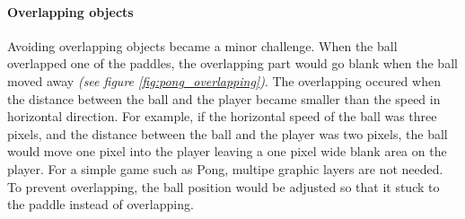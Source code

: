 \paragraph{Overlapping objects} 
Avoiding overlapping objects became a minor challenge. When the ball overlapped one of the paddles, the overlapping part would go blank when the ball moved away \emph{(see figure \ref{fig:pong_overlapping})}.
The overlapping occured when the distance between the ball and the player became smaller than the speed in horizontal direction. For example, if the horizontal speed of the ball was three pixels, and the distance between the ball and the player was two pixels, the ball would move one pixel into the player leaving a one pixel wide blank area on the player. For a simple game such as Pong, multipe graphic layers are not needed. To prevent overlapping, the ball position would be adjusted so that it stuck to the paddle instead of overlapping. 

